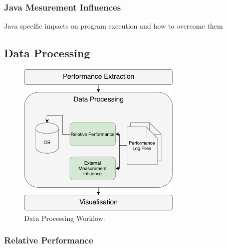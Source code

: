 


\subsubsection{Java Mesurement Influences}
\label{perf_measure}

Java specific impacts on program execution and how to overcome them


\subsection{Data Processing}
\label{data_prozessing}

\begin{figure}
  \centering
  \includegraphics[width=0.7\textwidth]{images/workflow_data_expanded}
  \caption{Data Processing Worklow.}
  \label{perf_extr_workflow}
\end{figure}

\subsubsection{Relative Performance}


